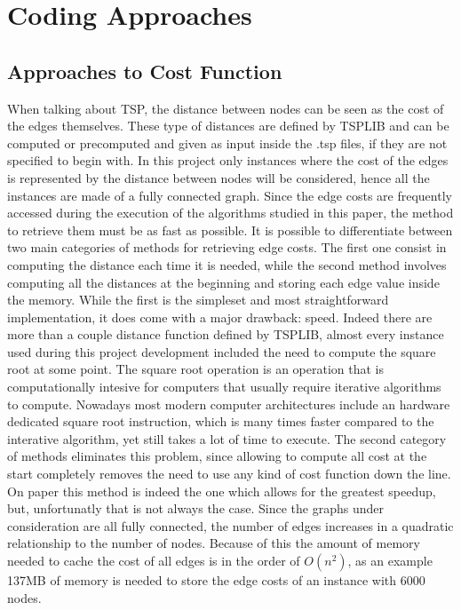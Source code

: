 \chapter{Coding Approaches}

\section{Approaches to Cost Function}

When talking about TSP, the distance between nodes can be seen as the cost of the edges themselves.
These type of distances are defined by TSPLIB\cite{tsplib} and can be computed or precomputed and given as input inside the .tsp files, if they are not specified to begin with.
In this project only instances where the cost of the edges is represented by the distance between nodes will be considered, hence all the instances are made of a fully connected graph.
Since the edge costs are frequently accessed during the execution of the algorithms studied in this paper, the method to retrieve them must be as fast as possible.
It is possible to differentiate between two main categories of methods for retrieving edge costs.
\newline
The first one consist in computing the distance each time it is needed, while the second method involves computing all the distances at the beginning and storing each edge value inside the memory.
While the first is the simpleset and most straightforward implementation, it does come with a major drawback: speed.
Indeed there are more than a couple distance function defined by TSPLIB, almost every instance used during this project development included the need to compute the square root at some point.
The square root operation is an operation that is computationally intesive for computers that usually require iterative algorithms to compute.
Nowadays most modern computer architectures include an hardware dedicated square root instruction, which is many times faster compared to the interative algorithm, yet still takes a lot of time to execute.
\newline
The second category of methods eliminates this problem, since allowing to compute all cost at the start completely removes the need to use any kind of cost function down the line.
On paper this method is indeed the one which allows for the greatest speedup, but, unfortunatly that is not always the case.
Since the graphs under consideration are all fully connected, the number of edges increases in a quadratic relationship to the number of nodes.
Because of this the amount of memory needed to cache the cost of all edges is in the order of $O(n^2)$, as an example 137MB of memory is needed to store the edge costs of an instance with 6000 nodes.
